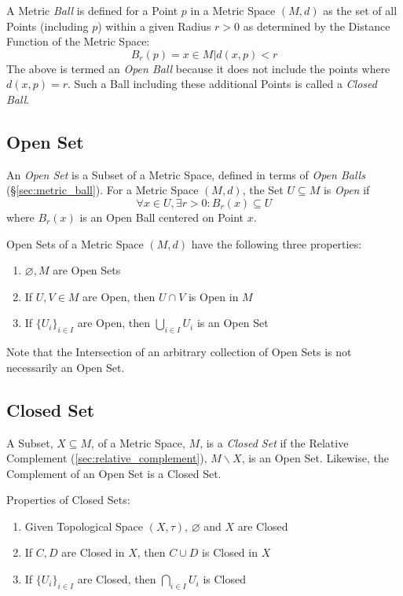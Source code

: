 A Metric \emph{Ball} is defined for a Point $p$ in a Metric Space
$(M,d)$ as the set of all Points (including $p$) within a given Radius
$r > 0$ as determined by the Distance Function of the Metric Space:
\[
    B_r(p) = {x \in M | d(x,p) < r }
\]
The above is termed an \emph{Open Ball} because it does not include
the points where $d(x,p) = r$. Such a Ball including these additional
Points is called a \emph{Closed Ball}.



\subsection{Open Set}\label{sec:open_set}

An \emph{Open Set} is a Subset of a Metric Space, defined in terms of
\emph{Open Balls} (\S\ref{sec:metric_ball}). For a Metric Space
$(M,d)$, the Set $U \subseteq M$ is \emph{Open} if
\[
    \forall x \in U, \exists r > 0 : B_r(x) \subseteq U
\]
where $B_r(x)$ is an Open Ball centered on Point $x$.

Open Sets of a Metric Space $(M,d)$ have the following three
properties:
\begin{enumerate}
\item $\varnothing, M$ are Open Sets
\item If $U, V \in M$ are Open, then $U \cap V$ is Open in $M$
\item If $\{ U_i \}_{i \in I}$ are Open, then $\bigcup_{i \in I}
  U_i$ is an Open Set
\end{enumerate}
\HandRight\; Note that the Intersection of an arbitrary collection of
Open Sets is not necessarily an Open Set.



\subsection{Closed Set}\label{sec:closed_set}

A Subset, $X \subseteq M$, of a Metric Space, $M$, is a \emph{Closed
  Set} if the Relative Complement (\ref{sec:relative_complement}), $M
\backslash X$, is an Open Set. Likewise, the Complement of an Open Set
is a Closed Set.

Properties of Closed Sets:
\begin{enumerate}
  \item Given Topological Space $(X, \tau)$, $\varnothing$ and $X$ are
    Closed
  \item If $C, D$ are Closed in $X$, then $C \cup D$ is Closed in $X$
  \item If $\{ U_i \}_{i \in I}$ are Closed, then $\bigcap_{i \in I}
    U_i$ is Closed
\end{enumerate}

